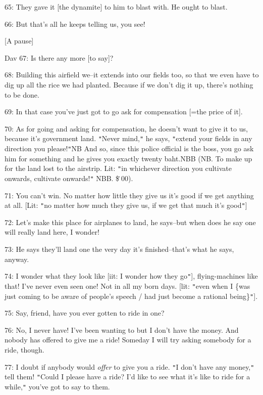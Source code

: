 65: They gave it [the dynamite] to him to blast with. He ought to blast.

66: But that's all he keeps telling us, you see!

\begin{center}
[A pause]
\end{center}

\leftskip=0pt
Dav 67: Is there any more [to say]?

68: Building this airfield we--it extends into our fields too, so that we even
have to dig up all the rice we had planted. Because if we don't dig it up, there's
nothing to be done.

69: In that case you've just got to go ask for compensation [=the price of it].

70: As for going and asking for compensation, he doesn't want to give it to us,
because it's government land. \texttt{"}Never mind,\texttt{"} he says, \texttt{"}extend
your fields in any direction you please!\texttt{"}NB And so, since this police
official is the boss, you go ask him for something and he gives you exactly twenty
baht.NBB (NB. To make up for the land lost to the airstrip. Lit: \texttt{"}in whichever
direction you cultivate onwards, cultivate onwards!\texttt{"} NBB. \$\.00).

71: You can't win. No matter how little they give us it's good if we get anything
at all. [Lit: \texttt{"}no matter how much they give us, if we get that much it's
good\texttt{"}]

72: Let's make this place for airplanes to land, he says--but when does he say
one will really land here, I wonder!

73: He says they'll land one the very day it's finished--that's what he says, anyway.

74: I wonder what they look like [iit: I wonder how they go\texttt{"}], flying-machines
like that! I've never even seen one! Not in all my born days. [lit: \texttt{"}even
when I \{was just coming to be aware of people's speech / had just become a rational
being\}\texttt{"}].

75: Say, friend, have you ever gotten to ride in one?

76: No, I never have! I've been wanting to but I don't have the money. And nobody
has offered to give me a ride! Someday I will try asking somebody for a ride, though.

77: I doubt if anybody would \textit{offer} to give you a ride. \texttt{"}I don't
have any money,\texttt{"} tell them! \texttt{"}Could I please have a ride? I'd
like to see what it's like to ride for a while,\texttt{"} you've got to say to
them.

